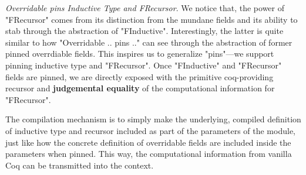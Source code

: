 \textit{Overridable pins Inductive Type and FRecursor}. We notice that,
the power of "FRecursor" comes from its distinction from the mundane
fields and its ability to stab through the abstraction of "FInductive".
Interestingly, the latter is quite similar to how "Overridable .. pins
{..}" can see through the abstraction of former pinned overrdiable
fields. This inspires us to generalize "pins"---we support pinning
inductive type and "FRecursor". Once "FInductive" and "FRecursor" fields
are pinned, we are directly exposed with the primitive coq-providing
recursor and \textbf{judgemental equality} of the computational
information for "FRecursor". 

The compilation mechanism is to simply make the underlying, compiled
definition of inductive type and recursor included as part of the
parameters of the module, just like how the concrete definition of
overridable fields are included inside the parameters when pinned. This
way, the computational information from vanilla Coq can be transmitted
into the context.  











